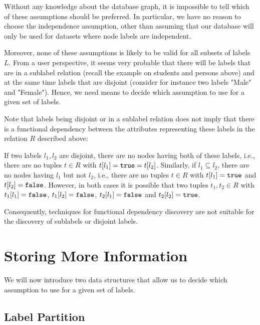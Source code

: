 Without any knowledge about the database graph, it is
impossible to tell which of these assumptions should be preferred.
In particular, we have no reason to choose the independence assumption, other
than assuming that our database will only be used for datasets where node
labels are independent.

Moreover, none of these assumptions is likely to be valid for
all subsets of labels $L$.
From a user perspective, it seems very probable that there will be labels
that are in a sublabel relation (recall the example on students and persons
above) and at the same time labels that are disjoint (consider for instance
two labels "Male" and "Female").
Hence, we need means to decide which assumption to use for a given set of labels.

\begin{remark}
Note that labels being disjoint or in a sublabel relation does not imply
that there is a functional dependency between the attributes representing
these labels in the relation $R$ described above:

If two labels $l_1, l_2$ are disjoint, there are no nodes having both of
these labels, i.e., there are no tuples $t \in R$
with $t[l_1] = \texttt{true} = t[l_2]$.
Similarly, if $l_1 \subseteq l_2$, there are no nodes having $l_1$ but not
$l_2$, i.e., there are no tuples $t \in R$ with $t[l_1] = \texttt{true}$ and
$t[l_2] = \texttt{false}$.
However, in both cases it is possible that two tuples $t_1, t_2 \in R$ with
$t_1[l_1] = \texttt{false}$, $t_1[l_2] = \texttt{false}$, $t_2[l_1] = \texttt{false}$ and
$t_2[l_2] = \texttt{true}$.

Consequently, techniques for functional dependency discovery are not suitable
for the discovery of sublabels or disjoint labels.
\end{remark}

\section{Storing More Information}
\label{sec:more-label-info}

We will now introduce two data structures that allow us to decide
which assumption to use for a given set of labels.

\subsection{Label Partition}
\label{sub:label-partition}

